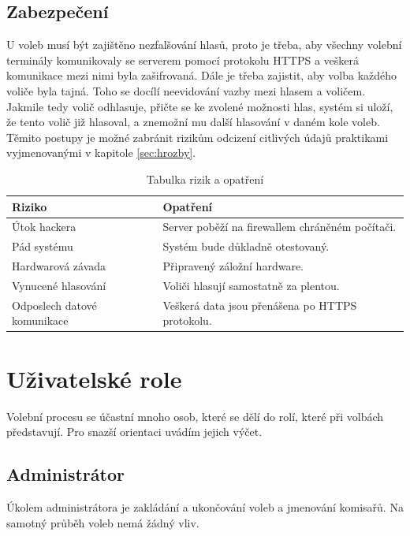 \documentclass[11pt,twoside,a4paper]{book}
\begin{document}
\subsection{Zabezpečení}

U voleb musí být zajištěno nezfalšování hlasů, proto je třeba, aby všechny volební terminály komunikovaly se serverem pomocí protokolu HTTPS a veškerá komunikace mezi nimi byla zašifrovaná. Dále je třeba zajistit, aby volba každého voliče byla tajná. Toho se docílí neevidování vazby mezi hlasem a voličem. Jakmile tedy volič odhlasuje, přičte se ke zvolené možnosti hlas, systém si uloží, že tento volič již hlasoval, a znemožní mu další hlasování v daném kole voleb. Těmito postupy je možné zabránit rizikům odcizení citlivých údajů praktikami vyjmenovanými v kapitole \ref{sec:hrozby}.

\begin{table}[h!]
	\begin{center}	
		\begin{tabular}{|l|l|}
		\hline		
		\textbf{Riziko} & \textbf{Opatření} \\
		\hline
		Útok hackera & Server poběží na firewallem chráněném počítači. \\
		\hline		
		Pád systému & Systém bude důkladně otestovaný. \\
		\hline
		Hardwarová závada & Připravený záložní hardware. \\
		\hline
		Vynucené hlasování & Voliči hlasují samostatně za plentou. \\
		\hline
		Odposlech datové komunikace & Veškerá data jsou přenášena po HTTPS protokolu. \\
		\hline
		\end{tabular}		
	\end{center}
	\caption{Tabulka rizik a opatření}
	\label{tab:rizika}
\end{table}

\section{Uživatelské role}

Volební procesu se účastní mnoho osob, které se dělí do rolí, které při volbách představují. Pro snazší orientaci uvádím jejich výčet.

\subsection{Administrátor}

Úkolem administrátora je zakládání a ukončování voleb a jmenování komisařů. Na samotný průběh voleb nemá žádný vliv. 
\end{document}
